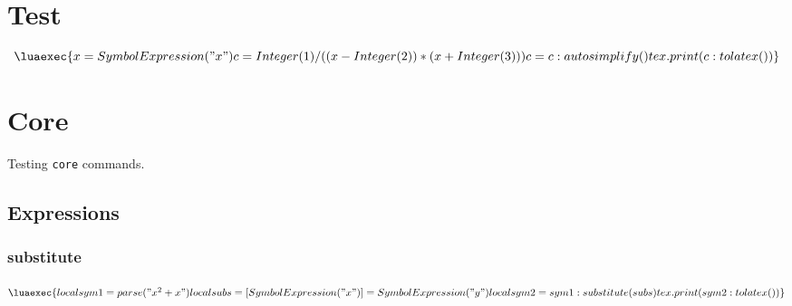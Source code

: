 \documentclass{article}
\begin{document}
\section{Test}

\[ \luaexec{
    x = SymbolExpression("x")
    c = Integer(1)/((x-Integer(2))*(x+Integer(3)))
    c = c:autosimplify()
    tex.print(c:tolatex())
} \]


\section{Core}
Testing \verb|core| commands. 

\subsection{Expressions}

\subsubsection{substitute}

$\luaexec{
    local sym1 = parse("x^2+x")
    local subs ={[SymbolExpression("x")]=SymbolExpression("y")}
    local sym2 = sym1:substitute(subs)
    tex.print(sym2:tolatex())
}$

    
\end{document}
